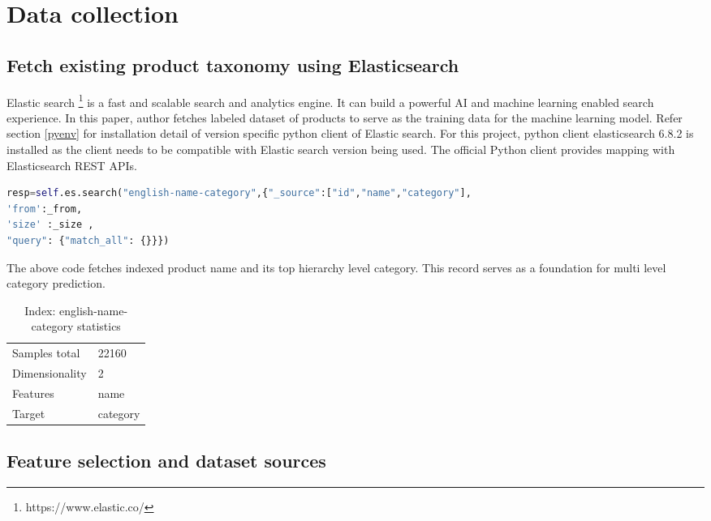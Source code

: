 \chapter{Data collection}


\section {Fetch existing product taxonomy using Elasticsearch}
Elastic search \footnote{https://www.elastic.co/} is a fast and scalable search and analytics engine. It can build a powerful AI and machine learning enabled search experience. In this paper, author fetches labeled dataset of products to serve as the training data for the machine learning model.
Refer section \ref {pyenv} for installation detail of version specific python client of Elastic search. For this project, python client elasticsearch 6.8.2 is installed as the client needs to be compatible with Elastic search version being used. The official Python client provides mapping with Elasticsearch REST APIs.

\begin{lstlisting}[language=Python]
resp=self.es.search("english-name-category",{"_source":["id","name","category"],
'from':_from,
'size' :_size ,
"query": {"match_all": {}}})
\end{lstlisting}

The above code fetches indexed product name and its top hierarchy level category. This record serves as a foundation for multi level category prediction.  

\begin{table}[h]
      \caption{Index: english-name-category statistics}
      \centering
      \label{table:enc}
\begin{tabular}{ll}
      \toprule 

      Samples total&22160 \\
      Dimensionality&2 \\
      Features&name \\
      Target&category \\
      
      \bottomrule
\end{tabular}
\end{table}



\section {Feature selection and dataset sources} \label{sec:feature-selection}

